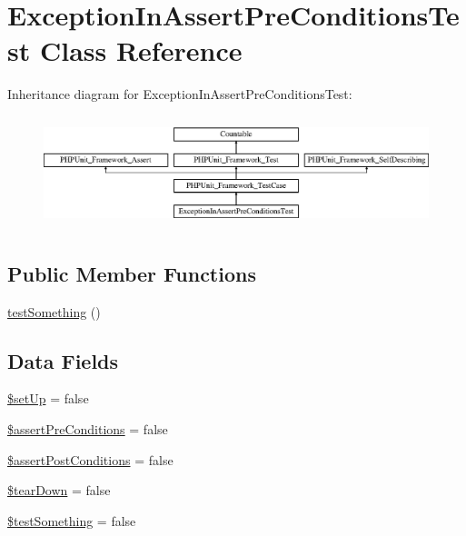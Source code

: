 \hypertarget{class_exception_in_assert_pre_conditions_test}{}\section{Exception\+In\+Assert\+Pre\+Conditions\+Test Class Reference}
\label{class_exception_in_assert_pre_conditions_test}
Inheritance diagram for Exception\+In\+Assert\+Pre\+Conditions\+Test\+:\begin{figure}[H]
\begin{center}
\leavevmode
\includegraphics[height=3.303835cm]{class_exception_in_assert_pre_conditions_test}
\end{center}
\end{figure}
\subsection*{Public Member Functions}
\begin{DoxyCompactItemize}
\item 
\mbox{\hyperlink{class_exception_in_assert_pre_conditions_test_a0fc4e17369bc9607ebdd850d9eda8167}{test\+Something}} ()
\end{DoxyCompactItemize}
\subsection*{Data Fields}
\begin{DoxyCompactItemize}
\item 
\mbox{\hyperlink{class_exception_in_assert_pre_conditions_test_aed7dec37f7cfd2a33216b3f81ebaeb8e}{\$set\+Up}} = false
\item 
\mbox{\hyperlink{class_exception_in_assert_pre_conditions_test_af1c82be5eeeef75035a066c7cc2eb172}{\$assert\+Pre\+Conditions}} = false
\item 
\mbox{\hyperlink{class_exception_in_assert_pre_conditions_test_ae16868ae0cb9f100fb80bf4987de5a85}{\$assert\+Post\+Conditions}} = false
\item 
\mbox{\hyperlink{class_exception_in_assert_pre_conditions_test_a9639b8e6f680299142ffe313f876712f}{\$tear\+Down}} = false
\item 
\mbox{\hyperlink{class_exception_in_assert_pre_conditions_test_a25acbdb5bf8dc30b31f537d60bfb02f5}{\$test\+Something}} = false
\end{DoxyCompactItemize}

